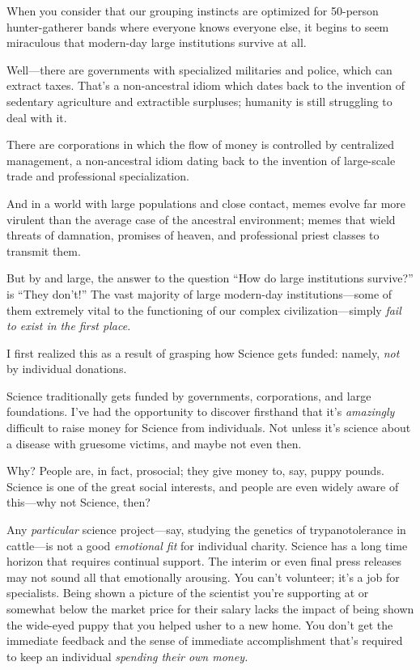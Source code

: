 {
 When you consider that our grouping instincts are optimized for
50-person hunter-gatherer bands where everyone knows everyone else, it
begins to seem miraculous that modern-day large institutions survive at
all. }

{
 Well---there are governments with specialized militaries and
police, which can extract taxes. That's a non-ancestral
idiom which dates back to the invention of sedentary agriculture and
extractible surpluses; humanity is still struggling to deal with it.}

{
 There are corporations in which the flow of money is controlled by
centralized management, a non-ancestral idiom dating back to the
invention of large-scale trade and professional specialization.}

{
 And in a world with large populations and close contact, memes
evolve far more virulent than the average case of the ancestral
environment; memes that wield threats of damnation, promises of heaven,
and professional priest classes to transmit them.}

{
 But by and large, the answer to the question
``How do large institutions
survive?'' is ``They
don't!'' The vast majority of large
modern-day institutions---some of them extremely vital to the
functioning of our complex civilization---simply \textit{fail to exist
in the first place.}}

{
 I first realized this as a result of grasping how Science gets
funded: namely, \textit{not} by individual donations.}

{
 Science traditionally gets funded by governments, corporations,
and large foundations. I've had the opportunity to
discover firsthand that it's \textit{amazingly}
difficult to raise money for Science from individuals. Not unless
it's science about a disease with gruesome victims, and
maybe not even then.}

{
 Why? People are, in fact, prosocial; they give money to, say,
puppy pounds. Science is one of the great social interests, and people
are even widely aware of this---why not Science, then?}

{
 Any \textit{particular} science project---say, studying the
genetics of trypanotolerance in cattle---is not a good
\textit{emotional fit} for individual charity. Science has a long time
horizon that requires continual support. The interim or even final
press releases may not sound all that emotionally arousing. You
can't volunteer; it's a job for
specialists. Being shown a picture of the scientist
you're supporting at or somewhat below the market price
for their salary lacks the impact of being shown the wide-eyed puppy
that you helped usher to a new home. You don't get the
immediate feedback and the sense of immediate accomplishment
that's required to keep an individual \textit{spending
their own money.}}

